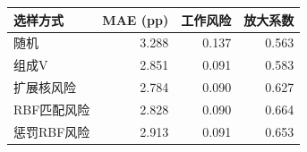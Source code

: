 \begin{tabular}{lrrr}\toprule
选样方式 & MAE (pp) & 工作风险 & 放大系数 \\ \midrule
随机 & 3.288 & 0.137 & 0.563 \\
组成V & 2.851 & 0.091 & 0.583 \\
扩展核风险 & 2.784 & 0.090 & 0.627 \\
RBF匹配风险 & 2.828 & 0.090 & 0.664 \\
惩罚RBF风险 & 2.913 & 0.091 & 0.653 \\
\bottomrule\end{tabular}
